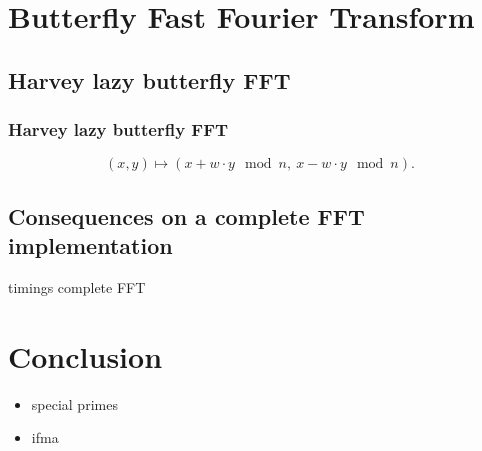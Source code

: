 \documentclass[10pt]{beamer}
\begin{document}
\section{Butterfly Fast Fourier Transform}
\subsection{Harvey lazy butterfly FFT}
\begin{frame}
    \frametitle{Harvey lazy butterfly FFT}
    \[
    (x,y) \mapsto (x + w\cdot y \mod n,\ x - w\cdot y \mod n).
    \]


\end{frame}

\subsection{Consequences on a complete FFT implementation}
\begin{frame}
    timings complete FFT
\end{frame}

\section{Conclusion}
\begin{frame}
    \begin{itemize}
        \item special primes
        \item ifma
    \end{itemize}
\end{frame}
\end{document}

